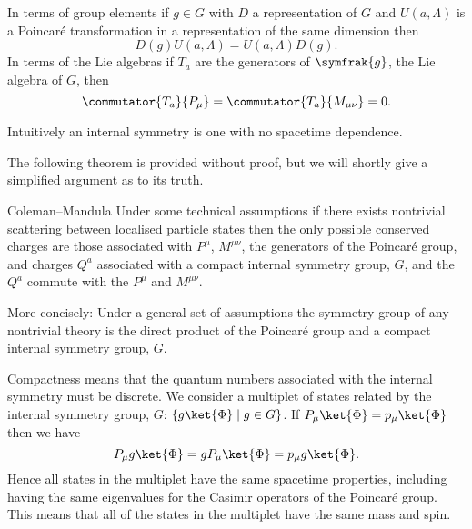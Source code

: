 \documentclass[fleqn]{NotesClass}
\renewcommand{\lie}[1]{\symfrak{#1}}
\begin{document}
    In terms of group elements if \(g \in G\) with \(D\) a representation of \(G\) and \(U(a, \Lambda)\) is a Poincar\'e transformation in a representation of the same dimension then
    \begin{equation}
        D(g)U(a, \Lambda) = U(a, \Lambda)D(g).
    \end{equation}
    In terms of the Lie algebras if \(T_a\) are the generators of \(\lie{g}\), the Lie algebra of \(G\), then
    \begin{equation}
        \commutator{T_a}{P_\mu} = \commutator{T_a}{M_{\mu\nu}} = 0.
    \end{equation}
    
    Intuitively an internal symmetry is one with no spacetime dependence.
    
    The following theorem is provided without proof, but we will shortly give a simplified argument as to its truth.
    
    \begin{thm}{Coleman--Mandula}{}
        Under some technical assumptions if there exists nontrivial scattering between localised particle states then the only possible conserved charges are those associated with \(P^\mu\), \(M^{\mu\nu}\), the generators of the Poincar\'e group, and charges \(Q^a\) associated with a compact internal symmetry group, \(G\), and the \(Q^a\) commute with the \(P^\mu\) and \(M^{\mu\nu}\).
        
        More concisely:
        Under a general set of assumptions the symmetry group of any nontrivial theory is the direct product of the Poincar\'e group and a compact internal symmetry group, \(G\).
    \end{thm}
    
    Compactness means that the quantum numbers associated with the internal symmetry must be discrete.
    We consider a multiplet of states related by the internal symmetry group, \(G\): \(\{g\ket{\Phi} \mid g \in G\}\).
    If \(P_\mu \ket{\Phi} = p_\mu\ket{\Phi}\) then we have
    \begin{equation}
        P_\mu g \ket{\Phi} = gP_\mu \ket{\Phi} = p_\mu g\ket{\Phi}.
    \end{equation}
    Hence all states in the multiplet have the same spacetime properties, including having the same eigenvalues for the Casimir operators of the Poincar\'e group.
    This means that all of the states in the multiplet have the same mass and spin.
    
\end{document}
